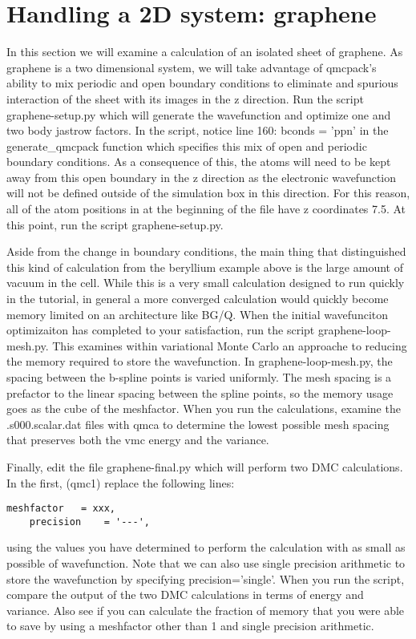 \section{Handling a 2D system: graphene}
In this section we will examine a calculation of an isolated sheet of graphene.  As graphene is a two dimensional system, we will take advantage of qmcpack's ability to mix periodic and open boundary conditions to eliminate and spurious interaction of the sheet with its images in the z direction.  Run the script graphene-setup.py which will generate the wavefunction and optimize one and two body jastrow factors.  In the script, notice line 160: bconds = 'ppn' in the generate\_qmcpack function which specifies this mix of open and periodic boundary conditions.  As a consequence of this, the atoms will need to be kept away from this open boundary in the z direction as the electronic wavefunction will not be defined outside of the simulation box in this direction.  For this reason, all of the atom positions in at the beginning of the file have z coordinates 7.5.  At this point, run the script graphene-setup.py.

Aside from the change in boundary conditions, the main thing that distinguished this kind of calculation from the beryllium example above is the large amount of vacuum in the cell.  While this is a very small calculation designed to run quickly in the tutorial, in general a more converged calculation would quickly become memory limited on an architecture like BG/Q.  When the initial wavefunciton optimizaiton has completed to your satisfaction, run the script graphene-loop-mesh.py.  This examines within variational Monte Carlo an approache to reducing the memory required to store the wavefunction.  In graphene-loop-mesh.py, the spacing between the b-spline points is varied uniformly.  The mesh spacing is a prefactor to the linear spacing between the spline points, so the memory usage goes as the cube of the meshfactor.  When you run the calculations, examine the .s000.scalar.dat files with qmca to determine the lowest possible mesh spacing that preserves both the vmc energy and the variance.  

Finally, edit the file graphene-final.py which will perform two DMC calculations.  In the first, (qmc1) replace the following lines:
\begin{lstlisting}[style=Python]
    meshfactor   = xxx,
    precision    = '---',
\end{lstlisting}
using the values you have determined to perform the calculation with as small as possible of wavefunction.  Note that we can also use single precision arithmetic to store the wavefunction by specifying precision='single'.  When you run the script, compare the output of the two DMC calculations in terms of energy and variance.  Also see if you can calculate the fraction of memory that you were able to save by using a meshfactor other than 1 and single precision arithmetic.

